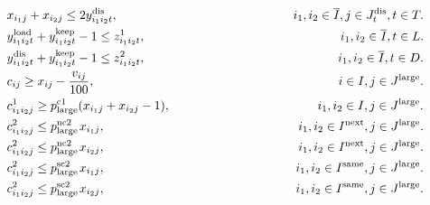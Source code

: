 \begin{center}
\begin{align}
&\hspace{3.0em} {x_{i_1j}} + {x_{i_2j}} \leq 2{y_{i_1i_2t}^{\rm{dis}}}, \hspace{14.19em} i_1, i_2 \in \overline{I}, j \in J_{t}^{\rm{dis}}, t \in T. \\
&\hspace{3.0em} {y_{i_1i_2t}^{\rm{load}}} + y_{i_1i_2t}^{\rm{keep}} - 1 \leq {z_{i_1i_2t}^1}, \hspace{15.77em}  i_1, i_2 \in \overline{I}, t \in L. \\
&\hspace{3.0em} {y_{i_1i_2t}^{\rm{dis}}} + y_{i_1i_2t}^{\rm{keep}} - 1 \leq {z_{i_1i_2t}^2}, \hspace{15.58em}  i_1, i_2 \in \overline{I}, t \in D. \\
&\hspace{3.0em} {c_{ij}} \geq x_{ij} - \frac{v_{ij}} {100}, \hspace{19.73em} i \in I, j \in J^{\rm{large}}. \\
&\hspace{3.0em} {c^1_{i_1i_2j}} \geq p_{\rm{large}}^{\rm{c1}} ({x_{i_1j}} + {x_{i_2j}} - 1), \hspace{11.91em} {i_1},{i_2} \in I, j \in J^{\rm{large}}. \\
&\hspace{3.0em} {c^2_{i_1i_2j}} \leq p_{\rm{large}}^{\rm{nc2}} \hspace{0.10em}{x_{i_1j}}, \hspace{15.64em} {i_1},{i_2} \in I^{\rm{next}}, j \in J^{\rm{large}}. \\
&\hspace{3.0em} {c^2_{i_1i_2j}} \leq p_{\rm{large}}^{\rm{nc2}} \hspace{0.10em}{x_{i_2j}}, \hspace{15.64em} {i_1},{i_2} \in I^{\rm{next}}, j \in J^{\rm{large}}. \\
&\hspace{3.0em} {c^2_{i_1i_2j}} \leq p_{\rm{large}}^{\rm{sc2}} \hspace{0.10em}{x_{i_1j}}, \hspace{15.43em}  {i_1},{i_2} \in I^{\rm{same}}, j \in J^{\rm{large}}. \\
&\hspace{3.0em} {c^2_{i_1i_2j}} \leq p_{\rm{large}}^{\rm{sc2}} \hspace{0.10em}{x_{i_2j}}, \hspace{15.43em} {i_1},{i_2} \in I^{\rm{same}}, j \in J^{\rm{large}}. \\

\end{align}
\end{center}
